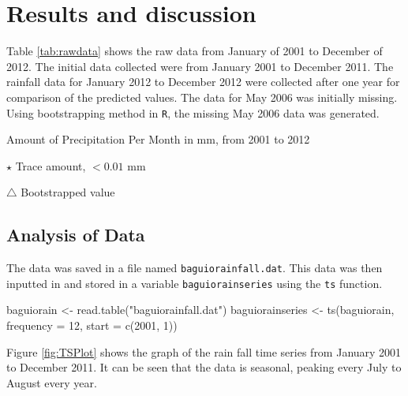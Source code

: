 \chapter{Results and discussion}

Table \eqref{tab:rawdata} shows the raw data from January of 2001 to December of 2012. The initial data collected were from January 2001 to December 2011. The rainfall data for January 2012 to December 2012 were collected after one year for comparison of the predicted values. The data for May 2006 was initially missing. Using bootstrapping method in \texttt{R}, the missing May 2006 data was generated.

\begin{table}[!ht]
\caption{Amount of Precipitation Per Month in mm, from 2001 to 2012}
\begin{threeparttable}
\begin{tablenotes}
\item [$\star$] Trace amount, $< 0.01$ mm
\item [$\triangle$] Bootstrapped value
\end{tablenotes}
\end{threeparttable}
\label{tab:rawdata}
\end{table}

\section*{Analysis of Data}

The data was saved in a file named \texttt{baguiorainfall.dat}. This data was then inputted in \Rstat{} and stored in a variable \texttt{baguiorainseries} using the \texttt{ts} function.

\begin{Schunk}
\begin{Sinput}
baguiorain <- read.table("baguiorainfall.dat")
baguiorainseries <- ts(baguiorain, frequency = 12, start = c(2001, 1))
\end{Sinput}
\end{Schunk}


Figure \eqref{fig:TSPlot} shows the graph of the rain fall time series from January 2001 to December 2011. It can be seen that the data is seasonal, peaking every July to August every year.

